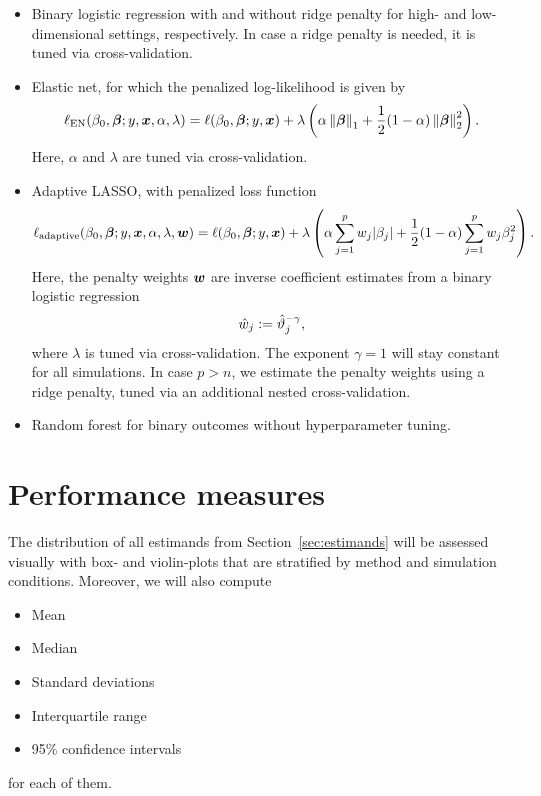 \documentclass[a4paper, 11pt]{article}\usepackage[]{graphicx}\usepackage[]{color}
\begin{document}
\begin{itemize}
   \item Binary logistic regression with and without ridge penalty for high- and
   low-dimensional settings, respectively. In case a ridge penalty is needed,
   it is tuned via cross-validation.
   \item Elastic net, for which the penalized log-likelihood is given by
    $$\ell_{\text{EN}}(\beta_0, \text{\boldmath$\beta$}; y, \text{\boldmath$x$}, \alpha, \lambda) = 
      \ell(\beta_0, \text{\boldmath$\beta$}; y, \text{\boldmath$x$}) + \lambda\left(\alpha \left\lVert\text{\boldmath$\beta$}\right\rVert_1 + \frac{1}{2} (1-\alpha) \left\lVert\text{\boldmath$\beta$}\right\rVert_2^2 \right).$$
    Here, $\alpha$ and $\lambda$ are tuned via cross-validation.
   \item Adaptive LASSO, with penalized loss function
    $$\ell_{\text{adaptive}}(\beta_0, \text{\boldmath$\beta$}; y, \text{\boldmath$x$}, \alpha, \lambda, \text{\boldmath$w$})
    = \ell(\beta_0, \text{\boldmath$\beta$}; y, \text{\boldmath$x$}) + \lambda\left(\alpha \sum_{j = 1}^p{w_j\lvert\beta_j\rvert} + \frac{1}{2} (1-\alpha) \sum_{j=1}^p{w_j\beta_j^2} \right).$$
    Here, the penalty weights $\text{\boldmath$w$}$ are inverse coefficient estimates from a
    binary logistic regression
    $$\hat{w}_j := \hat{\vartheta}_j^{-\gamma},$$
    where $\lambda$ is tuned via cross-validation.
    The exponent $\gamma = 1$ will stay constant for all simulations.
    In case $p > n$, we estimate the penalty weights using a ridge penalty, tuned
    via an additional nested  cross-validation.
   \item Random forest for binary outcomes without hyperparameter tuning.
\end{itemize}

\section{Performance measures} \label{sec:performance}

The distribution of all estimands from Section~\ref{sec:estimands} will be
assessed visually with box- and violin-plots that are stratified by method and
simulation conditions. Moreover, we will also compute
\begin{itemize}
  \item Mean
  \item Median
  \item Standard deviations
  \item Interquartile range
  \item 95\% confidence intervals
\end{itemize}
for each of them.
\end{document}
